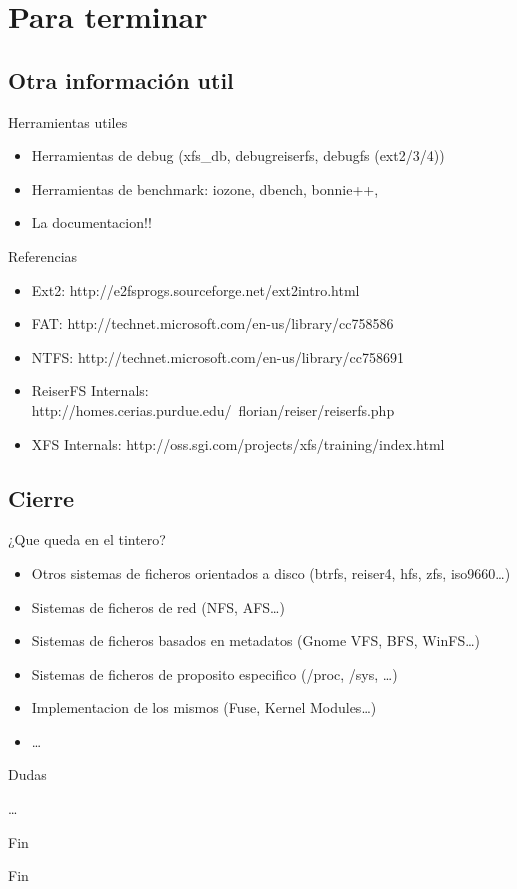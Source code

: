 \section*{Para terminar}
\subsection*{Otra información util}
\begin{frame}{Herramientas utiles}
  \begin{itemize}
    \item Herramientas de debug (xfs\_db, debugreiserfs, debugfs (ext2/3/4))
    \item Herramientas de benchmark: iozone, dbench, bonnie++,
    \item La documentacion!!
  \end{itemize}
\end{frame}

\begin{frame}{Referencias}
  \begin{itemize}
    \item Ext2: http://e2fsprogs.sourceforge.net/ext2intro.html
    \item FAT: http://technet.microsoft.com/en-us/library/cc758586%
    \item NTFS: http://technet.microsoft.com/en-us/library/cc758691%
    \item ReiserFS Internals: http://homes.cerias.purdue.edu/~florian/reiser/reiserfs.php
    \item XFS Internals: http://oss.sgi.com/projects/xfs/training/index.html
  \end{itemize}
\end{frame}

\subsection*{Cierre}

\begin{frame}{¿Que queda en el tintero?}
  \begin{itemize}
    \item Otros sistemas de ficheros orientados a disco (btrfs, reiser4, hfs, zfs, iso9660\dots)
    \item Sistemas de ficheros de red (NFS, AFS\dots)
    \item Sistemas de ficheros basados en metadatos (Gnome VFS, BFS, WinFS\dots)
    \item Sistemas de ficheros de proposito especifico (/proc, /sys, \dots)
    \item Implementacion de los mismos (Fuse, Kernel Modules\dots)
    \item \dots
  \end{itemize}
\end{frame}

\begin{frame}{Dudas}
  \begin{center}
    \dots
  \end{center}
\end{frame}

\begin{frame}{Fin}
  \begin{center}
    Fin
  \end{center}
\end{frame}
